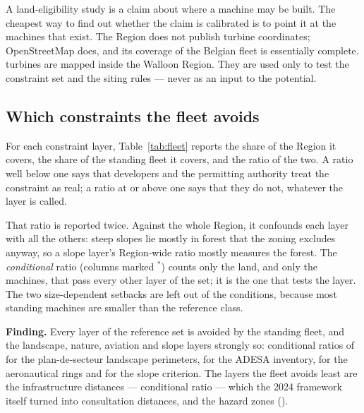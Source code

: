 \documentclass[11pt,a4paper]{article}
\newcommand{\finding}[1]{\par\medskip\noindent\colorbox{wal!10}{%
  \begin{minipage}{\dimexpr\linewidth-2\fboxsep}\textbf{Finding.} #1\end{minipage}}\par\medskip}
\begin{document}
A land-eligibility study is a claim about where a machine may be built. The
cheapest way to find out whether the claim is calibrated is to point it at the
machines that exist. The Region does not publish turbine coordinates;
OpenStreetMap does, and its coverage of the Belgian fleet is essentially
complete. \FleetN{} turbines are mapped inside the Walloon Region. They are used
only to test the constraint set and the siting rules --- never as an input to
the potential.

\subsection{Which constraints the fleet avoids}

For each constraint layer, Table~\ref{tab:fleet} reports the share of the Region
it covers, the share of the standing fleet it covers, and the ratio of the two.
A ratio well below one says that developers and the permitting authority treat
the constraint as real; a ratio at or above one says that they do not, whatever
the layer is called.

That ratio is reported twice. Against the whole Region, it confounds each layer
with all the others: steep slopes lie mostly in forest that the zoning excludes
anyway, so a slope layer's Region-wide ratio mostly measures the forest. The
\emph{conditional} ratio (columns marked $^*$) counts only the land, and only
the machines, that pass every other layer of the set; it is the one that tests
the layer. The two size-dependent setbacks are left out of the conditions,
because most standing machines are smaller than the reference class.

\begin{table}[htbp]\centering\footnotesize
\caption{Avoidance of each constraint layer by the \FleetN{} turbines standing
in Wallonia, reference turbine class. $^*$: conditional on every other
layer except the two size-dependent setbacks.}
\label{tab:fleet}

\end{table}

\finding{Every layer of the reference set is avoided by the standing fleet, and
the landscape, nature, aviation and slope layers strongly so: conditional ratios
of \FleetLandscapePdsCond{} for the plan-de-secteur landscape perimeters,
\FleetLandscapeAdesaCond{} for the ADESA inventory, \FleetAviationCond{} for the
aeronautical rings and \FleetSlopeCond{} for the slope criterion. The layers the
fleet avoids least are the infrastructure distances --- conditional ratio
\FleetInfraCond{} --- which the 2024 framework itself turned into consultation
distances, and the hazard zones (\FleetRiskCond{}).}
\end{document}
